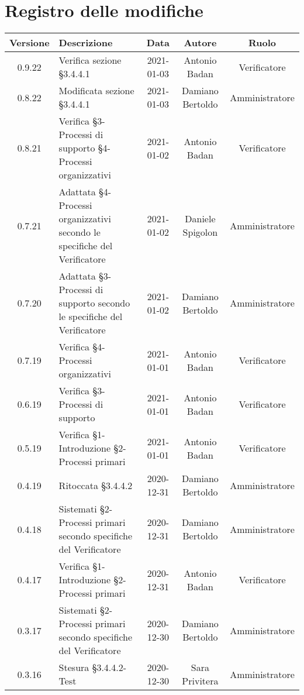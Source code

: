 \section*{Registro delle modifiche}

\begin{center}
	\begin{longtable}{|c|p{5cm}|c|c|c|}
	\hline
	\rowcolor{lighter-grayer}
	\textbf{Versione} & \textbf{Descrizione} & \textbf{Data} & \textbf{Autore} & \textbf{Ruolo} \\
	\hline
	\endfirsthead

	0.9.22 & Verifica sezione §3.4.4.1  & 2021-01-03 & Antonio Badan & Verificatore \\
	0.8.22 & Modificata sezione §3.4.4.1  & 2021-01-03 & Damiano Bertoldo & Amministratore \\
	\hline
	0.8.21 & Verifica §3-Processi di supporto §4-Processi organizzativi  & 2021-01-02 & Antonio Badan & Verificatore \\
	\hline
	0.7.21 & Adattata §4-Processi organizzativi secondo le specifiche del Verificatore & 2021-01-02 & Daniele Spigolon & Amministratore \\
	\hline
	0.7.20 & Adattata §3-Processi di supporto secondo le specifiche del Verificatore & 2021-01-02 & Damiano Bertoldo & Amministratore \\
	\hline
	0.7.19 & Verifica §4-Processi organizzativi & 2021-01-01 & Antonio Badan & Verificatore \\
	\hline
	0.6.19 & Verifica §3-Processi di supporto & 2021-01-01 & Antonio Badan & Verificatore \\
	\hline
	0.5.19 & Verifica §1-Introduzione §2-Processi primari & 2021-01-01 & Antonio Badan & Verificatore \\
	\hline
	0.4.19 & Ritoccata §3.4.4.2 & 2020-12-31 & Damiano Bertoldo & Amministratore \\
	\hline
	0.4.18 & Sistemati §2-Processi primari secondo specifiche del Verificatore & 2020-12-31 & Damiano Bertoldo & Amministratore \\
	\hline
	0.4.17 & Verifica §1-Introduzione §2-Processi primari & 2020-12-31 & Antonio Badan & Verificatore \\
	\hline
	0.3.17 & Sistemati §2-Processi primari secondo specifiche del Verificatore  & 2020-12-30 & Damiano Bertoldo & Amministratore \\
	\hline
	0.3.16 & Stesura §3.4.4.2-Test  & 2020-12-30 & Sara Privitera & Amministratore \\

\end{longtable}
\end{center}
